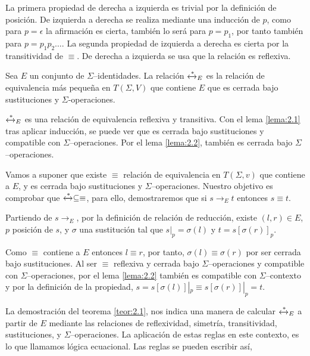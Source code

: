 \begin{demo}
  La primera propiedad de derecha a izquierda es trivial por la
  definición de posición. De izquierda a derecha se realiza mediante
  una inducción de $p$, como para $p= \epsilon$ la afirmación es
  cierta, también lo será para $p=p_1$, por tanto también para
  $p=p_1 p_2 \dots$.  La segunda propiedad de izquierda a derecha es
  cierta por la transitividad de $\equiv$. De derecha a izquierda se
  usa que la relación es reflexiva.
\end{demo}

\begin{teor} \label{teor:2.1}
  Sea $E$ un conjunto de $\Sigma$--identidades. La relación
  $\xleftrightarrow{*}_E$ es la relación de equivalencia más pequeña en
  $T(\Sigma,V)$ que contiene $E$ que es cerrada bajo sustituciones y
  $\Sigma$-operaciones.
\end{teor}

\begin{demo}
  $\xleftrightarrow{*}_E$ es una relación de equivalencia reflexiva y
  transitiva. Con el lema \ref{lema:2.1} tras aplicar inducción, se puede
  ver que es cerrada bajo sustituciones y compatible con
  $\Sigma$--operaciones. Por el lema \ref{lema:2.2}, también es cerrada bajo
  $\Sigma$--operaciones.

  Vamos a suponer que existe $\equiv$ relación de equivalencia en
  $T(\Sigma,v)$ que contiene a $E$, y es cerrada bajo sustituciones y
  $\Sigma$--operaciones. Nuestro objetivo es comprobar que
  $\xleftrightarrow{*} \subseteq \equiv$, para ello, demostraremos que
  si $s \rightarrow_E t$ entonces $s \equiv t$.

  Partiendo de $s \rightarrow_E$, por la definición de relación de
  reducción, existe $(l,r) \in E$, $p$ posición de $s$, y $\sigma$ una
  sustitución tal que $s|_p = \sigma(l)$ y $t= s [\sigma(r)]_p$. 

  Como $\equiv$ contiene a $E$ entonces $l \equiv r$, por tanto,
  $\sigma(l) \equiv \sigma(r)$ por ser cerrada bajo sustituciones.  Al
  ser $\equiv$ reflexiva y cerrada bajo $\Sigma$--operaciones y
  compatible con $\Sigma$--operaciones, por el lema \ref{lema:2.2} también
  es compatible con $\Sigma$--contexto y por la definición de la
  propiedad, $s = s[\sigma(l)]|_p \equiv s[\sigma(r)]|_p = t$.
\end{demo}

La demostración del teorema \ref{teor:2.1}, nos indica una manera de
calcular $\xleftrightarrow{*}_E$ a partir de $E$ mediante las
relaciones de reflexividad, simetría, transitividad, sustituciones,
y $\Sigma$--operaciones. La aplicación de estas reglas en este
contexto, es lo que llamamos lógica ecuacional. Las reglas se pueden escribir así,

